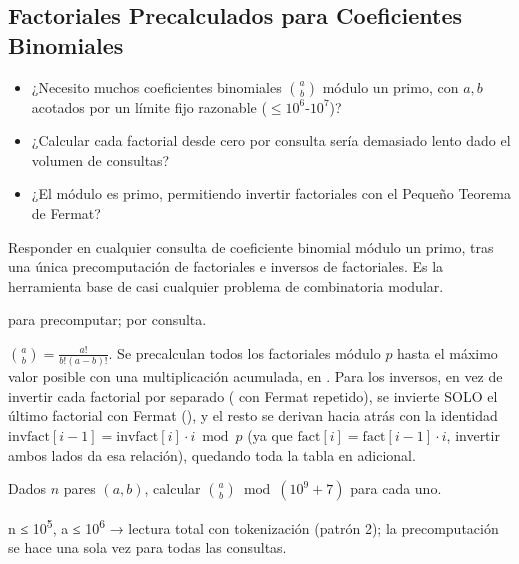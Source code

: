 \subsection{Factoriales Precalculados para Coeficientes Binomiales}


\begin{itemize}
\item ¿Necesito muchos coeficientes binomiales $\binom{a}{b}$ módulo un primo, con $a,b$ acotados por un límite fijo razonable ($\le 10^6$-$10^7$)?
\item ¿Calcular cada factorial desde cero por consulta sería demasiado lento dado el volumen de consultas?
\item ¿El módulo es primo, permitiendo invertir factoriales con el Pequeño Teorema de Fermat?
\end{itemize}

 Responder en  cualquier consulta de coeficiente binomial módulo un primo, tras una única precomputación de factoriales e inversos de factoriales. Es la herramienta base de casi cualquier problema de combinatoria modular.

  para precomputar;  por consulta.

 $\binom{a}{b} = \frac{a!}{b!(a-b)!}$. Se precalculan todos los factoriales módulo $p$ hasta el máximo valor posible con una multiplicación acumulada, en . Para los inversos, en vez de invertir cada factorial por separado ( con Fermat repetido), se invierte SOLO el último factorial con Fermat (), y el resto se derivan hacia atrás con la identidad $\text{invfact}[i-1] = \text{invfact}[i] \cdot i \bmod p$ (ya que $\text{fact}[i] = \text{fact}[i-1] \cdot i$, invertir ambos lados da esa relación), quedando toda la tabla en  adicional.


Dados $n$ pares $(a,b)$, calcular $\binom{a}{b} \bmod (10^9+7)$ para cada uno.

 n ≤ 10\textsuperscript{5}, a ≤ 10\textsuperscript{6} → lectura total con tokenización (patrón 2); la precomputación se hace una sola vez para todas las consultas.


